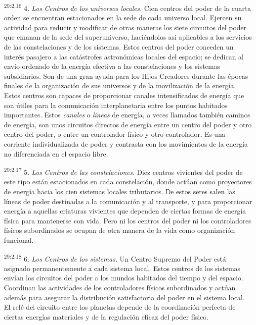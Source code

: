 \par
\textsuperscript{29:2.16} 4. \textit{Los Centros de los universos locales.} Cien centros del poder de la cuarta orden se encuentran estacionados en la sede de cada universo local. Ejercen su actividad para reducir y modificar de otras maneras los siete circuitos del poder que emanan de la sede del superuniverso, haciéndolos así aplicables a los servicios de las constelaciones y de los sistemas. Estos centros del poder conceden un interés pasajero a las catástrofes astronómicas locales del espacio; se dedican al envío ordenado de la energía efectiva a las constelaciones y los sistemas subsidiarios. Son de una gran ayuda para los Hijos Creadores durante las épocas finales de la organización de sus universos y de la movilización de la energía. Estos centros son capaces de proporcionar canales intensificados de energía que son útiles para la comunicación interplanetaria entre los puntos habitados importantes. Estos \textit{canales} o \textit{líneas} de energía, a veces llamados también caminos de energía, son unos circuitos directos de energía entre un centro del poder y otro centro del poder, o entre un controlador físico y otro controlador. Es una corriente individualizada de poder y contrasta con los movimientos de la energía no diferenciada en el espacio libre.

\par
\textsuperscript{29:2.17} 5. \textit{Los Centros de las constelaciones.} Diez centros vivientes del poder de este tipo están estacionados en cada constelación, donde actúan como proyectores de energía hacia los cien sistemas locales tributarios. De estos seres salen las líneas de poder destinadas a la comunicación y al transporte, y para proporcionar energía a aquellas criaturas vivientes que dependen de ciertas formas de energía física para mantenerse con vida. Pero ni los centros del poder ni los controladores físicos subordinados se ocupan de otra manera de la vida como organización funcional.

\par
\textsuperscript{29:2.18} 6. \textit{Los Centros de los sistemas.} Un Centro Supremo del Poder está asignado permanentemente a cada sistema local. Estos centros de los sistemas envían los circuitos del poder a los mundos habitados del tiempo y del espacio. Coordinan las actividades de los controladores físicos subordinados y actúan además para asegurar la distribución satisfactoria del poder en el sistema local. El relé del circuito entre los planetas depende de la coordinación perfecta de ciertas energías materiales y de la regulación eficaz del poder físico.

